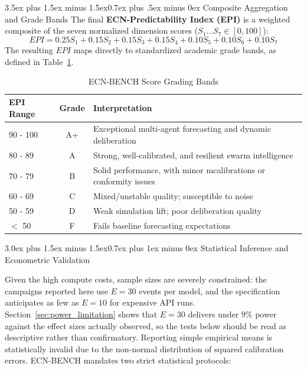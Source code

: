 \documentclass[11pt,journal,onecolumn]{IEEEtran}
\makeatletter
\renewcommand\section{\@startsection{section}{1}{\z@}%
  {3.0ex plus 1.5ex minus 1.5ex}{0.7ex plus 1ex minus 0ex}%
  {\normalfont\normalsize\centering\bfseries}}
\renewcommand\subsection{\@startsection{subsection}{2}{\z@}%
  {3.5ex plus 1.5ex minus 1.5ex}{0.7ex plus .5ex minus 0ex}%
  {\normalfont\normalsize\bfseries}}
\makeatother
\begin{document}
\subsection{Composite Aggregation and Grade Bands}
The final \textbf{ECN-Predictability Index (EPI)} is a weighted composite of the seven normalized dimension scores ($S_1 \dots S_7 \in [0, 100]$):
\begin{equation}
    EPI = 0.25 S_1 + 0.15 S_2 + 0.15 S_3 + 0.15 S_4 + 0.10 S_5 + 0.10 S_6 + 0.10 S_7
\end{equation}
The resulting $EPI$ maps directly to standardized academic grade bands, as defined in Table~\ref{tab:grades}.

\begin{table}[!htbp]
\centering
\caption{ECN-BENCH Score Grading Bands}
\begin{tabular}{lcl}
\toprule
\textbf{EPI Range} & \textbf{Grade} & \textbf{Interpretation} \\
\midrule
90 - 100 & A+ & Exceptional multi-agent forecasting and dynamic deliberation \\
80 - 89  & A  & Strong, well-calibrated, and resilient swarm intelligence \\
70 - 79  & B  & Solid performance, with minor mcalibrations or conformity issues \\
60 - 69  & C  & Mixed/unstable quality; susceptible to noise \\
50 - 59  & D  & Weak simulation lift; poor deliberation quality \\
$<$ 50   & F  & Fails baseline forecasting expectations \\
\bottomrule
\end{tabular}
\label{tab:grades}
\end{table}

\section{Statistical Inference and Econometric Validation}
\label{sec:statistics}

Given the high compute costs, sample sizes are severely constrained: the campaigns reported here use $E=30$ events per model, and the specification anticipates as few as $E=10$ for expensive API runs. Section~\ref{sec:power_limitation} shows that $E=30$ delivers under $9\%$ power against the effect sizes actually observed, so the tests below should be read as descriptive rather than confirmatory. Reporting simple empirical means is statistically invalid due to the non-normal distribution of squared calibration errors. ECN-BENCH mandates two strict statistical protocols:
\end{document}

